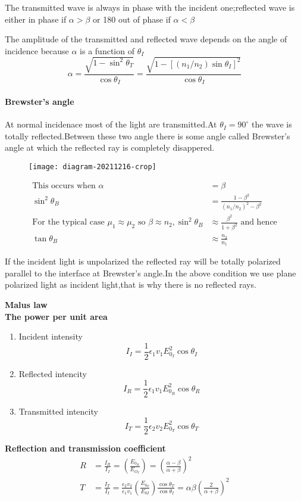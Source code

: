 \begin{note}
	The transmitted wave is always in phase with the incident one;reflected wave is either in phase if $\alpha>\beta$ or 180 out of phase if $\alpha< \beta$
\end{note}
The amplitude of the transmitted and reflected wave depends on the angle of incidence because $\alpha$ is a function of $\theta_I$
$$\alpha=\frac{\sqrt{1-\sin ^{2} \theta_{T}}}{\cos \theta_{I}}=\frac{\sqrt{1-\left[\left(n_{1} / n_{2}\right) \sin \theta_{I}\right]^{2}}}{\cos \theta_{I}}$$
\paragraph{Brewster's angle}
At normal incidenace most of the light are transmitted.At $\theta_I=90^{\circ}$ the wave is totally reflected.Between these two angle there is some angle called Brewster's angle at which the reflected ray is completely disappered.\\
\begin{figure}[H]
	\centering
	\texttt{[image: diagram-20211216-crop]}
	\caption{}
	\label{}
\end{figure}
\begin{align*}
\text{This occurs when }\alpha&=\beta\\
\sin ^{2} \theta_{B}&=\frac{1-\beta^{2}}{\left(n_{1} / n_{2}\right)^{2}-\beta^{2}}\\
\text{For the typical case }\mu_{1}\approx\mu_{2}\text{ so }\beta \approx n_2, \sin^2 \theta_{B}&\approx \frac{\beta^2}{1+\beta^2}\text{ and hence}\\
\tan \theta_{B} &\approx \frac{n_2}{n_1}
\end{align*}
\begin{note}
	If the incident light is unpolarized the reflected ray will be totally polarized parallel to the interface at Brewster's angle.In the above condition we use plane polarized light as incident light,that is why there is no reflected rays.
\end{note}
\textbf{ Malus law }\\
	\textbf{The power per unit area}
\begin{note}
	\begin{enumerate}
		\item Incident intensity\\
		$$I_I=\frac{1}{2}\epsilon_{1}v_1E_{0_I}^2 \cos \theta_{I}$$
		\item Reflected intencity
		$$I_R=\frac{1}{2}\epsilon_{1}v_1E_{0_R}^2 \cos \theta_{R}$$
		\item Transmitted intencity
		$$I_T=\frac{1}{2}\epsilon_{2}v_2E_{0_T}^2 \cos \theta_{T}$$
	\end{enumerate}
\end{note}
\textbf{Reflection and transmission coefficient}
\begin{align*}
R&=\frac{I_R}{I_I}=\left( \frac{E_{0_R}}{E_{O_I}}\right) =\left( \frac{\alpha-\beta}{\alpha+\beta}\right) ^2\\
T&=\frac{I_T}{I_I}=\frac{\epsilon_{2}v_2}{\epsilon_{1}v_1}\left( \frac{E_{0_T}}{E_{0I}}\right) \frac{\cos \theta_{T}}{\cos \theta_{I}}=\alpha \beta\left( \frac{2}{\alpha+\beta} \right) ^2
\end{align*}

